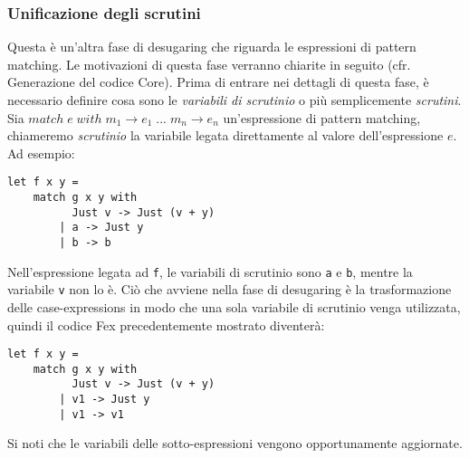 \documentclass[10pt,a4paper]{article}
\begin{document}
\subsubsection{Unificazione degli scrutini}
Questa è un'altra fase di desugaring che riguarda le espressioni di pattern matching. Le motivazioni di questa
fase verranno chiarite in seguito (cfr. Generazione del codice Core). Prima di entrare nei dettagli di questa fase,
è necessario definire cosa sono le \textit{variabili di scrutinio} o più semplicemente \textit{scrutini}. Sia
$ match \; e \; with \; m_1 \rightarrow e_1 \; ... \; m_n \rightarrow e_n $ un'espressione di pattern matching,
chiameremo \textit{scrutinio} la variabile legata direttamente al valore dell'espressione $ e $. Ad esempio:
\begin{lstlisting}
let f x y =
    match g x y with
          Just v -> Just (v + y)
        | a -> Just y
        | b -> b
\end{lstlisting}
Nell'espressione legata ad \texttt{f}, le variabili di scrutinio sono \texttt{a} e \texttt{b}, mentre la variabile
\texttt{v} non lo è. Ciò che avviene nella fase di desugaring è la trasformazione delle case-expressions in modo che
una sola variabile di scrutinio venga utilizzata, quindi il codice Fex precedentemente mostrato diventerà:
\begin{lstlisting}
let f x y =
    match g x y with
          Just v -> Just (v + y)
        | v1 -> Just y
        | v1 -> v1
\end{lstlisting}
Si noti che le variabili delle sotto-espressioni vengono opportunamente aggiornate.
\end{document}
